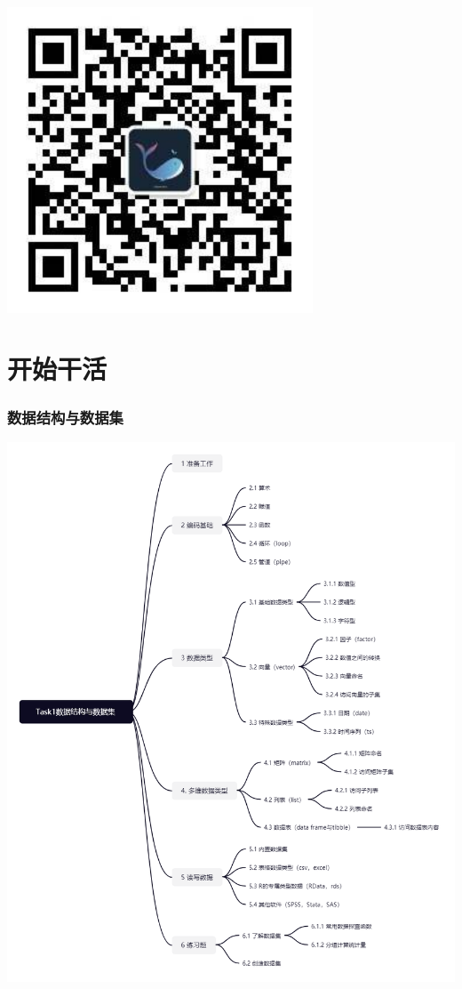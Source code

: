 \documentclass[]{ctexbook}
\begin{document}
\includegraphics[width=3.58in]{image/logo}

\hypertarget{part-ux5f00ux59cbux5e72ux6d3b}{%
\part{开始干活}\label{part-ux5f00ux59cbux5e72ux6d3b}}

\hypertarget{task-01}{%
\section{数据结构与数据集}\label{task-01}}

\includegraphics[width=1\textwidth,height=\textheight]{./image/task01_data_structure.jpg}
\end{document}
